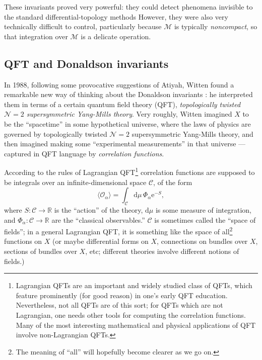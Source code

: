 \documentclass[12pt,letterpaper,reqno]{article}
\numberwithin{equation}{section}
\newcommand{\cC}{\ensuremath{\mathcal C}}
\newcommand{\cM}{\ensuremath{\mathcal M}}
\newcommand{\cO}{\ensuremath{\mathcal O}}
\newcommand{\R}{\ensuremath{\mathbb R}}
\newcommand{\N}{{\mathcal N}}
\newcommand{\e}{{\mathrm e}}
\newcommand{\de}{\mathrm{d}}
\newcommand{\IP}[1]{\langle#1\rangle}
\newcommand{\ti}[1]{\textit{#1}}
\newcommand{\fixme}[1]{{\color{orange}{[#1]}}}
\begin{document}
These invariants proved very powerful: they could detect phenomena invisible to 
the standard differential-topology methods \fixme{explain something proved using them?} 
However, they were also very technically
difficult to control, particularly because $\cM$ is typically
\ti{noncompact}, so that integration over $\cM$ is a delicate operation.


\subsection{QFT and Donaldson invariants}

In 1988, following some provocative suggestions of Atiyah,
Witten found a remarkable new way of thinking about
the Donaldson invariants \cite{Witten:1988ze}: he interpreted them
in terms of a certain quantum field theory (QFT),
\ti{topologically twisted $\N=2$ supersymmetric Yang-Mills theory}.
Very roughly, Witten imagined $X$ to be the ``spacetime''
in some hypothetical universe, where the laws of physics are governed
by topologically twisted $\N=2$ supersymmetric Yang-Mills theory,
and then imagined
making some ``experimental measurements'' in that universe --- captured
in QFT language by \ti{correlation functions}.

According to the rules of Lagrangian QFT\footnote{Lagrangian QFTs are an
important and widely studied class of QFTs, which feature prominently
(for good reason) in one's early QFT education. Nevertheless, not
all QFTs are of this sort; for QFTs which are not Lagrangian, one
needs other tools for computing the correlation functions. Many of the
most interesting mathematical and physical applications of QFT
involve non-Lagrangian QFTs.}
correlation functions are supposed to be integrals over an
infinite-dimensional space $\cC$, of the form
\begin{equation} \label{eq:correlator}
 \IP{\cO_\alpha} = \int_\cC \de \mu \, \Phi_\alpha \e^{-S},
\end{equation}
where $S: \cC \to \R$ is the ``action'' of the theory,
$\de \mu$ is some measure of integration,
and $\Phi_\alpha: \cC \to \R$ are the ``classical observables.''
$\cC$ is sometimes called the ``space of fields''; in a general Lagrangian QFT, it is
something like the space of all\footnote{The meaning of ``all'' will
hopefully become clearer as we go on.} functions on $X$ (or maybe differential forms on $X$,
connections on bundles over $X$, sections of bundles over $X$, etc; different theories involve
different notions of fields.) 
\end{document}

